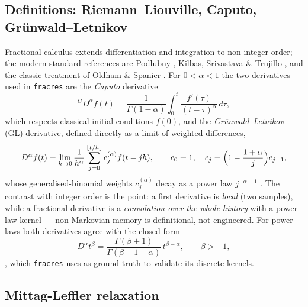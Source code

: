 \documentclass[11pt,a4paper]{article}
\begin{document}
\subsection{Definitions: Riemann--Liouville, Caputo, Gr\"unwald--Letnikov}

Fractional calculus extends differentiation and integration to non-integer
order; the modern standard references are Podlubny
\cite{podlubny1999fractional}, Kilbas, Srivastava \& Trujillo
\cite{kilbas2006theory}, and the classic treatment of Oldham \& Spanier
\cite{oldham1974fractional}. For $0 < \alpha < 1$ the two derivatives used in
\texttt{fracres} are the \emph{Caputo} derivative
\begin{equation}
  {}^C D^\alpha f(t) = \frac{1}{\Gamma(1-\alpha)}
  \int_0^t \frac{f'(\tau)}{(t-\tau)^{\alpha}}\,d\tau,
  \label{eq:caputo}
\end{equation}
which respects classical initial conditions $f(0)$, and the
\emph{Gr\"unwald--Letnikov} (GL) derivative, defined directly as a limit of
weighted differences,
\begin{equation}
  D^\alpha f(t) = \lim_{h \to 0} \frac{1}{h^\alpha}
  \sum_{j=0}^{\lfloor t/h \rfloor} c_j^{(\alpha)} f(t - jh),
  \qquad
  c_0 = 1,\quad c_j = \Bigl(1 - \frac{1+\alpha}{j}\Bigr) c_{j-1},
  \label{eq:gl}
\end{equation}
whose generalised-binomial weights $c_j^{(\alpha)}$ decay as a power law
$j^{-\alpha-1}$ \cite{oldham1974fractional,scherer2011grunwald}. The contrast
with integer order is the point: a first derivative is \emph{local} (two
samples), while a fractional derivative is a \emph{convolution over the whole
history} with a power-law kernel --- non-Markovian memory is definitional,
not engineered. For power laws both derivatives agree with the closed form
\begin{equation}
  D^\alpha t^\beta =
  \frac{\Gamma(\beta+1)}{\Gamma(\beta+1-\alpha)}\, t^{\beta-\alpha},
  \qquad \beta > -1,
  \label{eq:powerlaw}
\end{equation}
\cite[Eq.~2.117]{podlubny1999fractional}, which \texttt{fracres} uses as
ground truth to validate its discrete kernels.

\subsection{Mittag-Leffler relaxation}
\end{document}
